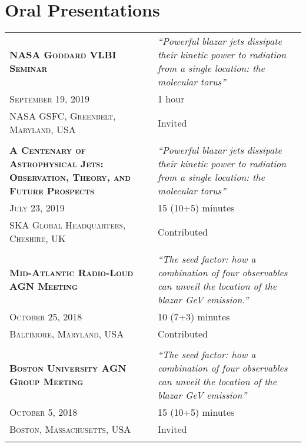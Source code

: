 %
%
%

\section{\texorpdfstring{\color{Blue}Oral Presentations}{Oral Presentations}}

\begin{longtable}{p{5cm}|p{12.3cm}}
    \textsc{\textbf{NASA Goddard VLBI Seminar}}& \emph{``Powerful blazar jets dissipate their kinetic power to radiation from a single location: the molecular torus''}\\
    \textsc{September 19, 2019}& 1 hour\\
    \textsc{NASA GSFC, Greenbelt, Maryland, USA}& Invited\\
    \multicolumn{2}{c}{} \\


    \textsc{\textbf{A Centenary of Astrophysical Jets: Observation, Theory, and Future Prospects}}& \emph{``Powerful blazar jets dissipate their kinetic power to radiation from a single location: the molecular torus''}\\
    \textsc{July 23, 2019}& 15 (10+5) minutes\\
    \textsc{SKA Global Headquarters, Cheshire, UK}& Contributed\\
    \multicolumn{2}{c}{} \\


    \textsc{\textbf{Mid-Atlantic Radio-Loud AGN Meeting}}& \emph{``The seed factor: how a combination of four observables can unveil the location of the blazar GeV emission.''}\\
    \textsc{October 25, 2018}& 10 (7+3) minutes\\
    \textsc{Baltimore, Maryland, USA}& Contributed\\
    \multicolumn{2}{c}{} \\


    \textsc{\textbf{Boston University AGN Group Meeting}}& \emph{``The seed factor: how a combination of four observables can unveil the location of the blazar GeV emission''}\\
    \textsc{October 5, 2018}& 15 (10+5) minutes\\
    \textsc{Boston, Massachusetts, USA}& Invited\\
    \multicolumn{2}{c}{} \\



\end{longtable}
